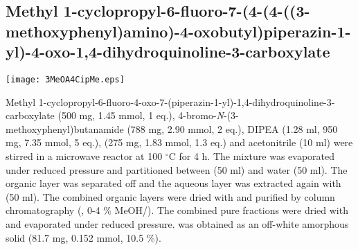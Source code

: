 \subsection{Methyl 1\hyp{}cyclopropyl\hyp{}6\hyp{}fluoro\hyp{}7\hyp{}(4\hyp{}(4\hyp{}((3\hyp{}methoxyphenyl)amino)\hyp{}4\hyp{}oxobutyl)\allowbreak piperazin\hyp{}1\hyp{}yl)\hyp{}4\hyp{}oxo\hyp{}1,4\hyp{}dihydroquinoline\hyp{}3\hyp{}carboxylate }


\begin{scheme}[H]
	\begin{center}
		\texttt{[image: 3MeOA4CipMe.eps]}
	\end{center}
\end{scheme}

Methyl 1\hyp{}cyclopropyl\hyp{}6\hyp{}fluoro\hyp{}4\hyp{}oxo\hyp{}7\hyp{}(piperazin\hyp{}1\hyp{}yl)\hyp{}1,4\hyp{}dihydroquinoline\hyp{}3\hyp{}carboxylate  (500 mg, 1.45 mmol, 1 eq.), 4\hyp{}bromo\hyp{}\textit{N}\hyp{}(3\hyp{}methoxyphenyl)butanamide  (788 mg, 2.90 mmol, 2 eq.), DIPEA (1.28 ml, 950 mg, 7.35 mmol, 5 eq.),  (275 mg, 1.83 mmol, 1.3 eq.) and acetonitrile (10 ml) were stirred in a microwave reactor at 100 $^{\circ}$C for 4 h. The mixture was evaporated under reduced pressure and partitioned between  (50 ml) and water (50 ml). The organic layer was separated off and the aqueous layer was extracted again with  (50 ml). The combined organic layers were dried with  and purified by column chromatography (, 0-4 \% MeOH/). The combined pure fractions were dried with  and evaporated under reduced pressure.  was obtained as an off-white amorphous solid (81.7 mg, 0.152 mmol, 10.5 \%).
\\[1\baselineskip]
\\[1\baselineskip]
\\[1\baselineskip]
